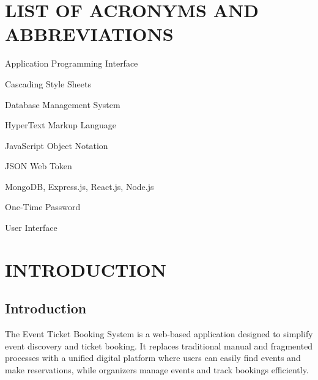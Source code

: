 \documentclass[12pt]{report}
\begin{document}
 
\newpage 
{} 
  
\chapter*{LIST OF ACRONYMS AND ABBREVIATIONS} 

\begin{abbrv} 

\item[API] Application Programming Interface
\item[CSS] Cascading Style Sheets
\item[DBMS] Database Management System
\item[HTML] HyperText Markup Language
\item[JSON] JavaScript Object Notation
\item[JWT] JSON Web Token
\item[MERN] MongoDB, Express.js, React.js, Node.js
\item[OTP] One-Time Password
\item[UI] User Interface

\end{abbrv}

\newpage 
\renewcommand*\contentsname{TABLE OF CONTENTS} 
   
\tableofcontents 
 


\thispagestyle{empty} 
 
\chapter{INTRODUCTION} 
\section{Introduction}
	The Event Ticket Booking System is a web-based application designed to simplify event discovery and ticket booking. It replaces traditional manual and fragmented processes with a unified digital platform where users can easily find events and make reservations, while organizers manage events and track bookings efficiently.
\end{document}
